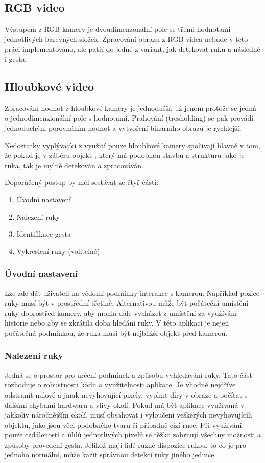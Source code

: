 \subsection{RGB video}
Výstupem z RGB kamery je dvoudimenzonální pole se třemi hodnotami jednotlivých barevných složek. Zpracování obrazu z RGB videa nebude v této práci implementováno, ale patří do jedné z variant, jak detekovat ruku a následně i gesta. \\

\subsection{Hloubkové video}
Zpracování hodnot z hloubkové kamery je jednodušší, už jenom protože se jedná o jednodimenzionální pole s hodnotami. Prahování (tresholding) se pak provádí jednoduchým porovnáním hodnot a vytvoření binárního obrazu je rychlejší.

Nedostatky vyplývající z využití pouze hloubkové kamery spočívají hlavně v tom, že pokud je v záběru objekt , který má podobnou stavbu a strukturu jako je ruka, tak je mylně detekován a zpracováván.

Doporučený postup by měl sestávat ze čtyř částí:

\begin{enumerate}
\item Úvodní nastavení
\item Nalezení ruky
\item Identifikace gesta
\item Vykreslení ruky (volitelné)
\end{enumerate}

\subsubsection{Úvodní nastavení}
Lze zde dát uživateli na vědomí podmínky interakce s kamerou. Například pozice ruky musí být v prostřední třetině. Alternativou může být počáteční umístění ruky doprostřed kamery, aby mohla dále vycházet z umístění za využívání historie nebo aby se zkrátila doba hledání ruky. V této aplikaci je nejen počátečná podmínkou, že ruka musí být nejbližší objekt před kamerou.

\subsubsection{Nalezení ruky}
Jedná se o prostor pro určení podmínek a způsobu vyhledávání ruky. Tato část rozhoduje o robustnosti kódu a využitelnosti aplikace. Je vhodné nejdříve odstranit nulové a jinak nevyhovující pixely, vyplnit díry v obraze a počítat s dalšími chybami hardwaru a vlivy okolí. Pokud má být aplikace využívaná v jakkoliv náročnějším okolí, musí obsahovat i vyloučení veškerých nevyhovujícíh objektů, jako jsou věci podobného tvaru či případně cizí ruce. Při využívání pouze czdáleností a úhlů jednotlivých pixelů se těžko zahrnují všechny možnosti a způsoby provedení gesta. Jelikož mají lidé různé dispozice rukou, to co je pro jednoho normální, může kazit správnou detekci ruky jiného jedince.


